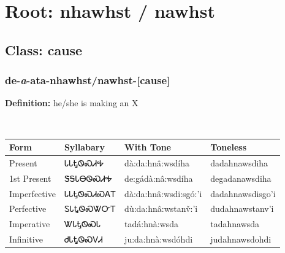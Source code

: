 \needspace{4in}
\section*{Root: nhawhst / nawhst}
\nopagebreak
{}
\needspace{3in}
\subsection*{Class: cause}
\nopagebreak
\needspace{2in}
\subsubsection*{de{-}\textit{a}{-}ata{-}\textbf{nhawhst/nawhst}{-}[cause]}
\nopagebreak
\textbf{Definition: } he/she is making an X
\\[0.5em]
\begin{tabularx}{\textwidth}{l X X X}%
\toprule%
\textbf{Form}&\textbf{Syllabary}&\textbf{With Tone}&\textbf{Toneless}\\%
\midrule%
Present&ᏓᏓᎿᏫᏍᏗᎭ&dà:da:hnâ:wsdíha&dadahnawsdiha\\%
1st Present&ᏕᎦᏓᎾᏫᏍᏗᎭ&de:gádà:nâ:wsdíha&degadanawsdiha\\%
Imperfective&ᏓᏓᎿᏫᏍᏗᏍᎪᎢ&dà:da:hnâ:wsdi:sgó:’i&dadahnawsdisgo’i\\%
Perfective&ᏚᏓᎿᏫᏍᏔᏅᎢ&dù:da:hnâ:wstanv̌:’i&dudahnawstanv’i\\%
Imperative&ᏔᏓᎿᏫᏍᏓ&tadá:hnà:wsda&tadahnawsda\\%
Infinitive&ᏧᏓᎿᏫᏍᏙᏗ&ju:da:hnà:wsdóhdi&judahnawsdohdi\\%
\bottomrule%
\end{tabularx}
\\[1em]